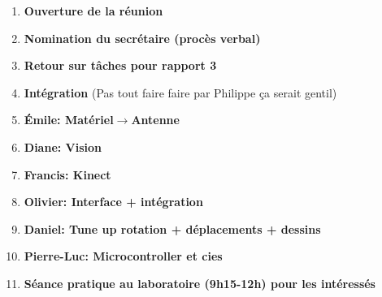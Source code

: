 \documentclass[12pt]{ULojpv}
\begin{document}
\entete
\begin{enumerate}
   \item \textbf{Ouverture de la réunion}
   \item \textbf{Nomination du secrétaire (procès verbal)}
   \item \textbf{Retour sur tâches pour rapport 3}
   \item \textbf{Intégration} (Pas tout faire faire par Philippe ça serait gentil)
   \item \textbf{Émile: Matériel$\rightarrow$Antenne}
   \item \textbf{Diane: Vision}
   \item \textbf{Francis: Kinect}
   \item \textbf{Olivier: Interface + intégration}
   \item \textbf{Daniel: Tune up rotation + déplacements + dessins}
   \item \textbf{Pierre-Luc: Microcontroller et cies}
   \item \textbf{Séance pratique au laboratoire (9h15-12h) pour les intéressés}
\end{enumerate}
   
\end{document}
